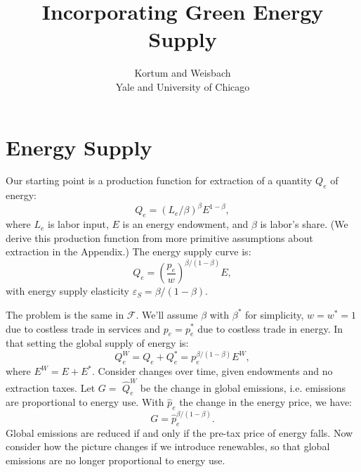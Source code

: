 \documentclass[notitlepage,12pt]{article}
\begin{document}
\title{Incorporating Green Energy Supply}
\author{Kortum and Weisbach \\
Yale and University of Chicago}
\maketitle

\begin{abstract}
\end{abstract}

\section{Energy Supply}

Our starting point is a production function for extraction of a quantity $%
Q_{e}$ of energy:%
\begin{equation}
Q_{e}=\left( L_{e}/\beta \right) ^{\beta }E^{1-\beta },  \label{e production}
\end{equation}%
where $L_{e}$ is labor input, $E$ is an energy endowment, and $\beta $ is
labor's share. (We derive this production function from more primitive
assumptions about extraction in the Appendix.) The energy supply curve is:%
\begin{equation*}
Q_{e}=\left( \frac{p_{e}}{w}\right) ^{\beta /(1-\beta )}E,
\end{equation*}%
with energy supply elasticity $\varepsilon _{S}=\beta /(1-\beta )$.

The problem is the same in $\mathcal{F}$. We'll assume $\beta $ with $\beta
^{\ast }$ for simplicity, $w=w^{\ast }=1$ due to costless trade in services
and $p_{e}=p_{e}^{\ast }$ due to costless trade in energy. In that setting
the global supply of energy is:%
\begin{equation*}
Q_{e}^{W}=Q_{e}+Q_{e}^{\ast }=p_{e}^{\beta /(1-\beta )}E^{W},
\end{equation*}%
where $E^{W}=E+E^{\ast }$. Consider changes over time, given endowments and
no extraction taxes. Let $G=$ $\hat{Q}_{e}^{W}$ be the change in global
emissions, i.e. emissions are proportional to energy use. With $\hat{p}_{e}$
the change in the energy price, we have:%
\begin{equation*}
G=\hat{p}_{e}^{\beta /(1-\beta )}.
\end{equation*}%
Global emissions are reduced if and only if the pre-tax price of energy
falls. Now consider how the picture changes if we introduce renewables, so
that global emissions are no longer proportional to energy use.
\end{document}

